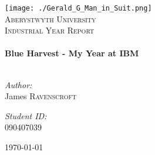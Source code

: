 \begin{titlepage}
 
\begin{center}
 
 
\texttt{[image: ./Gerald\_G\_Man\_in\_Suit.png]}\\[1cm]
 
\textsc{\LARGE Aberystwyth University}\\[1.5cm]
 
\textsc{\LARGE Industrial Year Report}\\[0.5cm]
 
 
\HRule \\[0.4cm]
{ \huge \bfseries Blue Harvest - My Year at IBM }\\[0.4cm]
 
\HRule \\[1.5cm]

\begin{minipage}{0.4\textwidth}
\begin{flushleft} \large
\emph{Author:}\\
James \textsc{Ravenscroft}
\end{flushleft}
\end{minipage}
\begin{minipage}{0.4\textwidth}
\begin{flushright} \large
\emph{Student ID:} \\
090407039
\end{flushright}
\end{minipage}

\vfill
 
{\large \today}
 
\end{center}
 
\end{titlepage}

